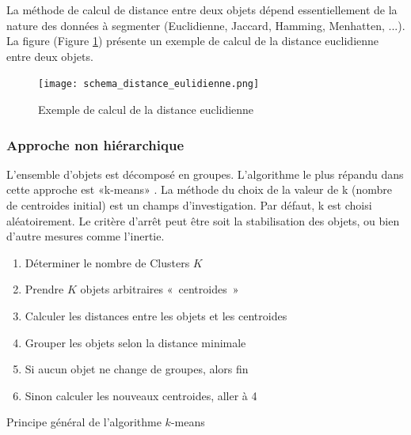 \documentclass[a4paper,12pt]{report}
\begin{document}
        La méthode de calcul de distance entre deux objets dépend essentiellement de
        la nature des données à segmenter (Euclidienne, Jaccard, Hamming,
        Menhatten, ...). La figure (Figure \ref{fig:distance_eulidienne}) présente un exemple de calcul de la distance
        euclidienne entre deux objets.
            
        \begin{figure}[h]
            \centering
            \texttt{[image: schema\_distance\_eulidienne.png]}
            \caption{Exemple de calcul de la distance euclidienne}
            \label{fig:distance_eulidienne}
        \end{figure}

        \subsubsection*{Approche non hiérarchique}

        L'ensemble d'objets est décomposé en groupes. L’algorithme le plus répandu
        dans cette approche est «k-means» . La méthode du choix de la
        valeur de k (nombre de centroides initial) est un champs d’investigation. Par
        défaut, k est choisi aléatoirement. Le critère d’arrêt peut être soit la stabilisation
        des objets, ou bien d’autre mesures comme l’inertie. \\


        \begin{enumerate}[leftmargin=*]
            \item Déterminer le nombre de Clusters \( K\)
            \item Prendre \( K \) objets arbitraires «~centroides~»
            \item Calculer les distances entre les objets et les centroides
            \item Grouper les objets selon la distance minimale
            \item Si aucun objet ne change de groupes, alors fin
            \item Sinon calculer les nouveaux centroides, aller à 4
        \end{enumerate}
        
        Principe général de l’algorithme \( k \)-means
\end{document}
